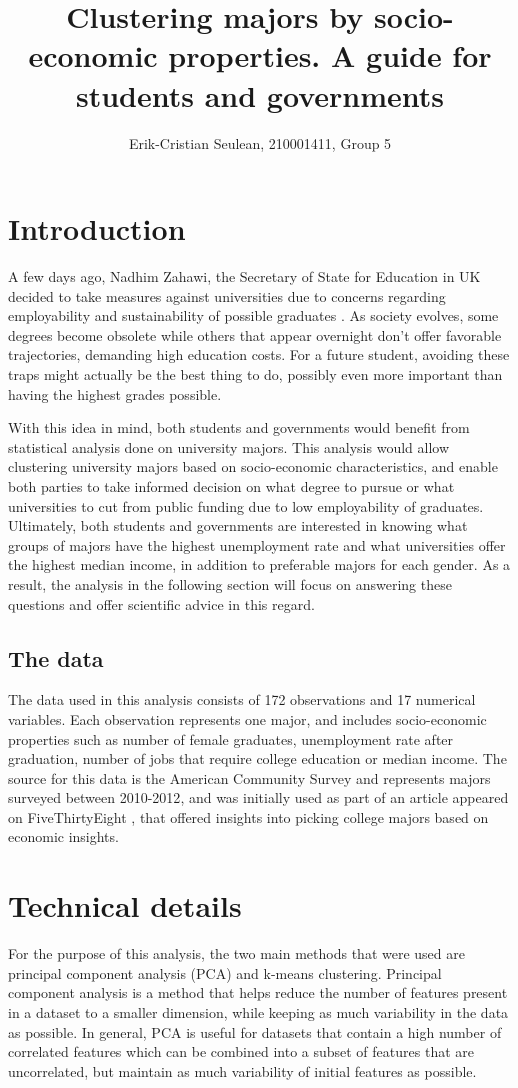 \documentclass[11pt]{article}
\date{}
\title{Clustering majors by socio-economic properties. A guide for students and governments}
\author{Erik-Cristian Seulean, 210001411, Group 5}
\begin{document}
\newpage
\maketitle

\section*{Introduction}
A few days ago, Nadhim Zahawi, the Secretary of State for Education in UK decided to take measures against universities due to concerns regarding employability and sustainability of possible graduates \cite{dailymail}. As society evolves, some degrees become obsolete while others that appear overnight don't offer favorable trajectories, demanding high education costs. For a future student, avoiding these traps might actually be the best thing to do, possibly even more important than having the highest grades possible. 

With this idea in mind, both students and governments would benefit from statistical analysis done on university majors. This analysis would allow clustering university majors based on socio-economic characteristics, and enable both parties to take informed decision on what degree to pursue or what universities to cut from public funding due to low employability of graduates. Ultimately, both students and governments are interested in knowing what groups of majors have the highest unemployment rate and what universities offer the highest median income, in addition to preferable majors for each gender. As a result, the analysis in the following section will focus on answering these questions and offer scientific advice in this regard.

\subsection*{The data}
The data used in this analysis consists of 172 observations and 17 numerical variables. Each observation represents one major, and includes socio-economic properties such as number of female graduates, unemployment rate after graduation, number of jobs that require college education or median income. The source for this data is the American Community Survey and represents majors surveyed between 2010-2012\cite{acs}, and was initially used as part of an article appeared on FiveThirtyEight \cite{fivethirtyeight}, that offered insights into picking college majors based on economic insights.

\section*{Technical details}
For the purpose of this analysis, the two main methods that were used are principal component analysis (PCA) and k-means clustering. Principal component analysis is a method that helps reduce the number of features present in a dataset to a smaller dimension, while keeping as much variability in the data as possible. In general, PCA is useful for datasets that contain a high number of correlated features which can be combined into a subset of features that are uncorrelated, but maintain as much variability of initial features as possible.
\end{document}
